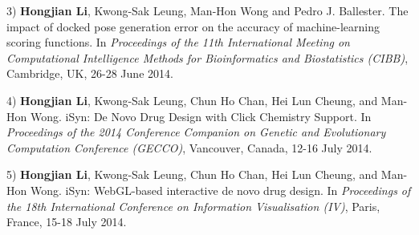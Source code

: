 3) \textbf{Hongjian Li}, Kwong-Sak Leung, Man-Hon Wong and Pedro J. Ballester. The impact of docked pose generation error on the accuracy of machine-learning scoring functions. In \textit{Proceedings of the 11th International Meeting on Computational Intelligence Methods for Bioinformatics and Biostatistics (CIBB)}, Cambridge, UK, 26-28 June 2014.

4) \textbf{Hongjian Li}, Kwong-Sak Leung, Chun Ho Chan, Hei Lun Cheung, and Man-Hon Wong. iSyn: De Novo Drug Design with Click Chemistry Support. In \textit{Proceedings of the 2014 Conference Companion on Genetic and Evolutionary Computation Conference (GECCO)}, Vancouver, Canada, 12-16 July 2014.

5) \textbf{Hongjian Li}, Kwong-Sak Leung, Chun Ho Chan, Hei Lun Cheung, and Man-Hon Wong. iSyn: WebGL-based interactive de novo drug design. In \textit{Proceedings of the 18th International Conference on Information Visualisation (IV)}, Paris, France, 15-18 July 2014.

\chapterend
